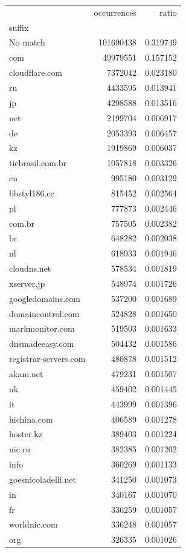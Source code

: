 \begin{tabular}{lrr}
\toprule
 & occurrences & ratio \\
suffix &  &  \\
\midrule
No match & 101690438 & 0.319749 \\
com & 49979551 & 0.157152 \\
cloudflare.com & 7372042 & 0.023180 \\
ru & 4433595 & 0.013941 \\
jp & 4298588 & 0.013516 \\
net & 2199704 & 0.006917 \\
de & 2053393 & 0.006457 \\
kz & 1919869 & 0.006037 \\
ticbrasil.com.br & 1057818 & 0.003326 \\
cn & 995180 & 0.003129 \\
bbstyl186.cc & 815452 & 0.002564 \\
pl & 777873 & 0.002446 \\
com.br & 757505 & 0.002382 \\
br & 648282 & 0.002038 \\
nl & 618933 & 0.001946 \\
cloudns.net & 578534 & 0.001819 \\
xserver.jp & 548974 & 0.001726 \\
googledomains.com & 537200 & 0.001689 \\
domaincontrol.com & 524828 & 0.001650 \\
markmonitor.com & 519503 & 0.001633 \\
dnsmadeeasy.com & 504432 & 0.001586 \\
registrar-servers.com & 480878 & 0.001512 \\
akam.net & 479231 & 0.001507 \\
uk & 459402 & 0.001445 \\
it & 443999 & 0.001396 \\
hichina.com & 406589 & 0.001278 \\
hoster.kz & 389403 & 0.001224 \\
nic.ru & 382385 & 0.001202 \\
info & 360269 & 0.001133 \\
goesnicoladelli.net & 341250 & 0.001073 \\
in & 340167 & 0.001070 \\
fr & 336259 & 0.001057 \\
worldnic.com & 336248 & 0.001057 \\
org & 326335 & 0.001026 \\

\end{tabular}
